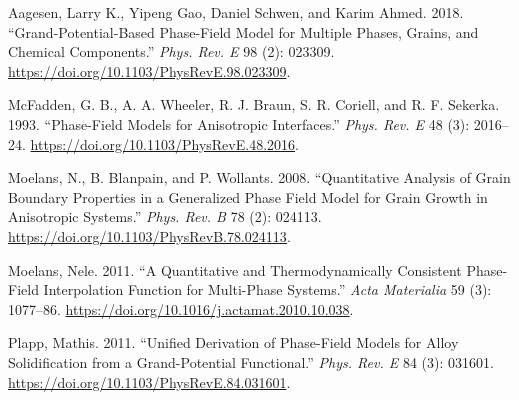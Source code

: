 \documentclass[11pt]{article}
\begin{document}
\begin{hangparas}{1.5em}{1}
\hypertarget{citeproc_bib_item_1}{Aagesen, Larry K., Yipeng Gao, Daniel Schwen, and Karim Ahmed. 2018. “Grand-Potential-Based Phase-Field Model for Multiple Phases, Grains, and Chemical Components.” \textit{Phys. Rev. E} 98 (2): 023309. \url{https://doi.org/10.1103/PhysRevE.98.023309}.}

\hypertarget{citeproc_bib_item_2}{McFadden, G. B., A. A. Wheeler, R. J. Braun, S. R. Coriell, and R. F. Sekerka. 1993. “Phase-Field Models for Anisotropic Interfaces.” \textit{Phys. Rev. E} 48 (3): 2016–24. \url{https://doi.org/10.1103/PhysRevE.48.2016}.}

\hypertarget{citeproc_bib_item_3}{Moelans, N., B. Blanpain, and P. Wollants. 2008. “Quantitative Analysis of Grain Boundary Properties in a Generalized Phase Field Model for Grain Growth in Anisotropic Systems.” \textit{Phys. Rev. B} 78 (2): 024113. \url{https://doi.org/10.1103/PhysRevB.78.024113}.}

\hypertarget{citeproc_bib_item_4}{Moelans, Nele. 2011. “A Quantitative and Thermodynamically Consistent Phase-Field Interpolation Function for Multi-Phase Systems.” \textit{Acta Materialia} 59 (3): 1077–86. \url{https://doi.org/10.1016/j.actamat.2010.10.038}.}

\hypertarget{citeproc_bib_item_5}{Plapp, Mathis. 2011. “Unified Derivation of Phase-Field Models for Alloy Solidification from a Grand-Potential Functional.” \textit{Phys. Rev. E} 84 (3): 031601. \url{https://doi.org/10.1103/PhysRevE.84.031601}.}\bigskip
\end{hangparas}
\end{document}
